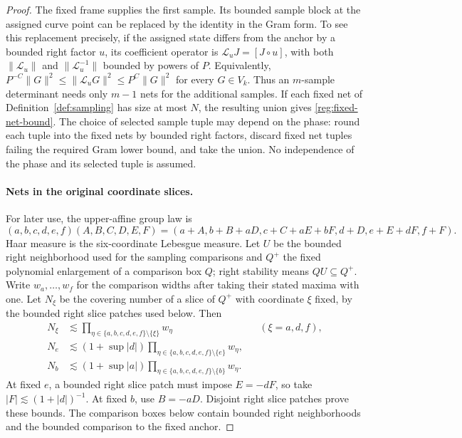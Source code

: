 \documentclass[11pt]{amsart}
\theoremstyle{definition}
\theoremstyle{remark}
\numberwithin{equation}{section}
\begin{document}
\begin{proof}
The fixed frame supplies the first sample. Its bounded sample block at the assigned curve point can be replaced by the identity in the Gram form. To see this replacement precisely, if the assigned state differs from the anchor by a bounded right factor $u$, its coefficient operator is $\mathcal L_uJ=[J\circ u]$, with both $\|\mathcal L_u\|$ and $\|\mathcal L_u^{-1}\|$ bounded by powers of $P$. Equivalently, $P^{-C}\|G\|^2\le\|\mathcal L_uG\|^2\le P^C\|G\|^2$ for every $G\in V_k$. Thus an $m$-sample determinant needs only $m-1$ nets for the additional samples. If each fixed net of Definition~\ref{def:sampling} has size at most $N$, the resulting union gives \eqref{reg:fixed-net-bound}. The choice of selected sample tuple may depend on the phase: round each tuple into the fixed nets by bounded right factors, discard fixed net tuples failing the required Gram lower bound, and take the union. No independence of the phase and its selected tuple is assumed.

\paragraph{Nets in the original coordinate slices.}

For later use, the upper-affine group law is
\[
(a,b,c,d,e,f)(A,B,C,D,E,F)=(a+A,b+B+aD,c+C+aE+bF,d+D,e+E+dF,f+F).
\]
Haar measure is the six-coordinate Lebesgue measure. Let $U$ be the bounded right neighborhood used for the sampling comparisons and $Q^+$ the fixed polynomial enlargement of a comparison box $Q$; right stability means $QU\subseteq Q^+$. Write $w_a,\ldots,w_f$ for the comparison widths after taking their stated maxima with one. Let $N_\xi$ be the covering number of a slice of $Q^+$ with coordinate $\xi$ fixed, by the bounded right slice patches used below. Then
\[
\begin{aligned}
N_\xi&\lesssim\prod_{\eta\in\{a,b,c,d,e,f\}\setminus\{\xi\}}w_\eta &&(\xi=a,d,f),\\
N_e&\lesssim(1+\sup|d|)\prod_{\eta\in\{a,b,c,d,e,f\}\setminus\{e\}}w_\eta,\\
N_b&\lesssim(1+\sup|a|)\prod_{\eta\in\{a,b,c,d,e,f\}\setminus\{b\}}w_\eta.
\end{aligned}
\]
At fixed $e$, a bounded right slice patch must impose $E=-dF$, so take $|F|\lesssim(1+|d|)^{-1}$. At fixed $b$, use $B=-aD$. Disjoint right slice patches prove these bounds. The comparison boxes below contain bounded right neighborhoods and the bounded comparison to the fixed anchor.


\end{proof}
\end{document}
